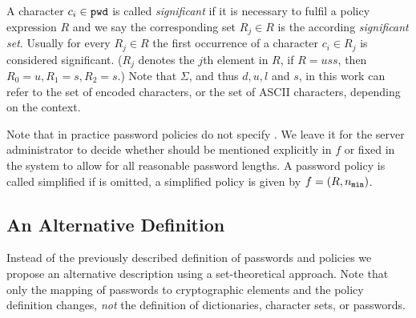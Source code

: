 \noindent
A character $c_i\in\mathtt{pwd}$ is called \emph{significant} if it is necessary to fulfil a policy expression $R$ and we say the corresponding set $R_j\in R$ is the according \emph{significant set}.
Usually for every $R_j\in R$ the first occurrence of a character $c_i\in R_j$ is considered significant.
($R_j$ denotes the $j$th element in $R$, \eg if $R=uss$, then $R_0=u,R_1=s,R_2=s$.)
Note that $\Sigma$, and thus $d,u,l$ and $s$, in this work can refer to the set of encoded characters, or the set of \ac{ASCII}  characters, depending on the context.

\begin{remark}
Note that in practice password policies do not specify \pmax. 
We leave it for the server administrator to decide whether \pmax should be mentioned explicitly in $f$ or fixed in the system to allow for all reasonable password lengths.
A password policy is called simplified if \pmax is omitted, \ie a simplified policy is given by $f=(R,{n_\mathtt{min}})$.
\end{remark}


\subsection{An Alternative Definition}\label{sec:spc-passwords}
Instead of the previously described definition of passwords and policies we propose an alternative description using a set-theoretical approach.
Note that only the mapping of passwords to cryptographic elements and the policy definition changes, \emph{not} the definition of dictionaries, character sets, or passwords.

